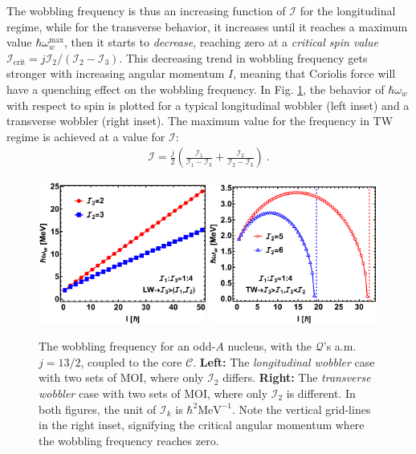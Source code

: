 The wobbling frequency is thus an increasing function of $\mathscr{I}$ for the longitudinal regime, while for the transverse behavior, it increases until it reaches a maximum value $\hbar\omega_w^\text{max}$, then it starts to \emph{decrease}, reaching zero at a \emph{critical spin value} $\mathscr{I}_\text{crit}=j\mathcal{I}_2/(\mathcal{I}_2-\mathcal{I}_3)$. This decreasing trend in wobbling frequency gets stronger with increasing angular momentum $I$, meaning that Coriolis force will have a quenching effect on the wobbling frequency. In Fig. \ref{wobbling-freq-oddA}, the behavior of $\hbar\omega_w$ with respect to spin is plotted for a typical longitudinal wobbler (left inset) and a transverse wobbler (right inset). The maximum value for the frequency in TW regime is achieved at a value for $\mathscr{I}$:
\begin{align}
    \mathscr{I}=\frac{j}{2}\left(\frac{\mathcal{I}_1}{\mathcal{I}_1-\mathcal{I}_3}+\frac{\mathcal{I}_2}{\mathcal{I}_2-\mathcal{I}_3}\right)\ .
\end{align}
\begin{figure}
    \centering
    \includegraphics[width=0.49\textwidth]{Chapters/Figures/wobb_freq_oddA-LW.pdf}
    \includegraphics[width=0.49\textwidth]{Chapters/Figures/wobb_freq_oddA-TW.pdf}
    \caption{The wobbling frequency for an odd-$A$ nucleus, with the $\mathcal{Q}$'s a.m. $j=13/2$, coupled to the core $\mathscr{C}$. \textbf{Left:} The \emph{longitudinal wobbler} case with two sets of MOI, where only $\mathcal{I}_2$ differs. \textbf{Right:} The \emph{transverse wobbler} case with two sets of MOI, where only $\mathcal{I}_2$ is different. In both figures, the unit of $\mathcal{I}_k$ is $\hbar^2\text{MeV}^{-1}$. Note the vertical grid-lines in the right inset, signifying the critical angular momentum where the wobbling frequency reaches zero.}
    \label{wobbling-freq-oddA}
\end{figure}
